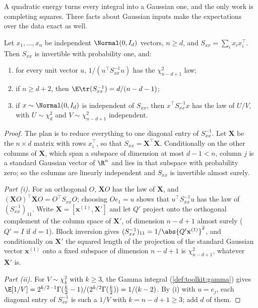 \begin{refsection}
A quadratic energy turns every integral into a Gaussian one, and the only work is completing squares. Three facts about Gaussian inputs make the expectations over the data exact as well.

\begin{lemma}\label{lem:regular:wishart}
Let $x_1,\dots,x_n$ be independent $\Normal(0,I_d)$ vectors, $n\ge d$, and $S_{xx}=\sum_ix_ix_i^\top$. Then $S_{xx}$ is invertible with probability one, and:
\begin{enumerate}
\item for every unit vector $u$, $1/(u^\top S_{xx}^{-1}u)$ has the $\chi^2_{n-d+1}$ law;
\item if $n\ge d+2$, then $\E\tr(S_{xx}^{-1})=d/(n-d-1)$;
\item if $x\sim\Normal(0,I_d)$ is independent of $S_{xx}$, then $x^\top S_{xx}^{-1}x$ has the law of $U/V$, with $U\sim\chi^2_d$ and $V\sim\chi^2_{n-d+1}$ independent.
\end{enumerate}
\end{lemma}

\begin{proof}
The plan is to reduce everything to one diagonal entry of $S_{xx}^{-1}$. Let $\mathbf X$ be the $n\times d$ matrix with rows $x_i^\top$, so that $S_{xx}=\mathbf X^\top\mathbf X$. Conditionally on the other columns of $\mathbf X$, which span a subspace of dimension at most $d-1<n$, column $j$ is a standard Gaussian vector of $\R^n$ and lies in that subspace with probability zero; so the columns are linearly independent and $S_{xx}$ is invertible almost surely.

\emph{Part (i).} For an orthogonal $O$, $\mathbf XO$ has the law of $\mathbf X$, and $(\mathbf XO)^\top\mathbf XO=O^\top S_{xx}O$; choosing $Oe_1=u$ shows that $u^\top S_{xx}^{-1}u$ has the law of $(S_{xx}^{-1})_{11}$. Write $\mathbf X=[\mathbf x^{(1)},\mathbf X']$ and let $Q'$ project onto the orthogonal complement of the column space of $\mathbf X'$, of dimension $n-d+1$ almost surely ($Q'=I$ if $d=1$). Block inversion gives $(S_{xx}^{-1})_{11}=1/\abs{Q'\mathbf x^{(1)}}^2$, and conditionally on $\mathbf X'$ the squared length of the projection of the standard Gaussian vector $\mathbf x^{(1)}$ onto a fixed subspace of dimension $n-d+1$ is $\chi^2_{n-d+1}$, whatever $\mathbf X'$ is.

\emph{Part (ii).} For $V\sim\chi^2_k$ with $k\ge3$, the Gamma integral (\cref{def:toolkit:gamma}) gives $\E[1/V]=2^{k/2-1}\Gamma(\frac k2-1)/(2^{k/2}\Gamma(\frac k2))=1/(k-2)$. By (i) with $u=e_j$, each diagonal entry of $S_{xx}^{-1}$ is such a $1/V$ with $k=n-d+1\ge3$; add $d$ of them.


\end{proof}
\end{refsection}
